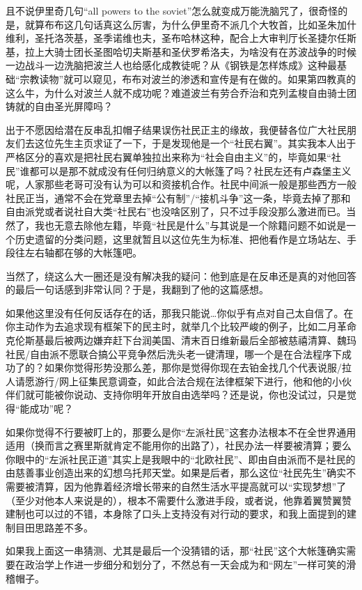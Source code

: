 \begin{zhihuanswer}
且不说伊里奇几句``all powers to the
soviet''怎么就变成万能洗脑咒了，很奇怪的是，就算布布这几句话真这么厉害，为什么伊里奇不派几个大牧首，比如圣朱加什维利，圣托洛茨基，圣季诺维也夫，圣布哈林这种，配合上大审判厅长圣捷尔任斯基，拉上大骑士团长圣图哈切夫斯基和圣伏罗希洛夫，为啥没有在苏波战争的时候一边战斗一边洗脑把波兰人也给感化成教徒呢？从《钢铁是怎样炼成》这种最基础``宗教读物''就可以窥见，布布对波兰的渗透和宣传是有在做的。如果第四教真的这么牛，为什么对波兰人就不成功呢？难道波兰有劳合乔治和克列孟梭自由骑士团铸就的自由圣光屏障吗？

出于不愿因给潜在反串乱扣帽子结果误伤社民正主的缘故，我便替各位广大社民朋友们去这位先生主页求证了一下，于是发现他是一个``社民右翼''。其实我本人出于严格区分的喜欢是把社民右翼单独拉出来称为``社会自由主义''的，毕竟如果``社民''谁都可以是那不就成没有任何归纳意义的大帐篷了吗？社民左还有卢森堡主义呢，人家那些老哥可没有认为可以和资接机合作。社民中间派一般是那些西方一般社民正当，通常不会在党章里去掉``公有制''/``接机斗争''这一条，毕竟去掉了那和自由派党或者说社自大类``社民右''也没啥区别了，只不过手段没那么激进而已。当然了，我也无意去除他左籍，毕竟``社民是什么''与其说是一个除籍问题不如说是一个历史遗留的分类问题，这里就暂且以这位先生为标准、把他看作是立场站左、手段往左右轴都在够的大帐篷吧。

当然了，绕这么大一圈还是没有解决我的疑问：他到底是在反串还是真的对他回答的最后一句话感到非常认同？于是，我翻到了他的这篇感想。

如果他这里没有任何反话存在的话，那我只能说\ldots 你似乎有点对自己太自信了。在你主动作为去追求现有框架下的民主时，就举几个比较严峻的例子，比如二月革命克伦斯基最后被两边嫌弃赶下台润美国、清末百日维新最后全部被慈禧清算、魏玛社民/自由派不愿联合搞公平竞争然后洗头老一键清理，哪一个是在合法程序下成功了的？如果你觉得形势没那么差，那你是觉得你现在去铂金找几个代表说服/拉人请愿游行/网上征集民意调查，如此合法合规在法律框架下进行，他和他的小伙伴们就可能被你说动、支持你明年开放自由选举吗？还是说，你也没试过，只是觉得``能成功''呢？

如果你觉得不行要被盯上的，那要么是你``左派社民''这套办法根本不在全世界通用适用（换而言之赛里斯就肯定不能用你的出路了），社民办法一样要被清算；要么你眼中的``左派社民正道''其实上是我眼中的``北欧社民''、即由自由派而不是社民的由慈善事业创造出来的幻想乌托邦天堂。如果是后者，那么这位``社民先生''确实不需要被清算，因为他靠着经济增长带来的自然生活水平提高就可以``实现梦想''了（至少对他本人来说是的），根本不需要什么激进手段，或者说，他靠着翼赞翼赞建制也可以过的不错，本身除了口头上支持没有对行动的要求，和我上面提到的建制目田思路差不多。

如果我上面这一串猜测、尤其是最后一个没猜错的话，那``社民''这个大帐篷确实需要在政治学上作进一步细分和划分了，不然总有一天会成为和``网左''一样可笑的滑稽帽子。
\end{zhihuanswer}
